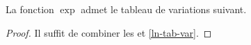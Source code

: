 \begin{fact} \label{ln-tab-var}
	La fonction $\exp$ admet le tableau de variations suivant.
	\begin{center}
	\end{center}
\end{fact}


\begin{proof}
	Il suffit de combiner les  et \ref{ln-tab-var}.
\end{proof}
